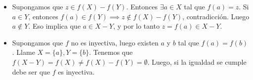 \begin{sol}
	\begin{itemize}
		\item Supongamos que $z \in f(X) - f(Y)$. Entonces $\exists a \in X $ tal que $f(a) = z$. Si $a \in Y$, entonces $f(a) \in f(Y) \implies z\notin f(X)-f(Y)$, contradicci\'on. Luego $a\notin Y$. Eso implica que $a\in X-Y$, y por lo tanto $z = f(a) \in X-Y$.
		\item Supongamos que $f$ no es inyectiva, luego existen $a$ y $b$ tal que $f(a) = f(b)$. Llame $X = \{a\}, Y = \{b\}$. Tenemos que $f(X-Y) = f(X) \neq f(X) - f(Y) = \emptyset$. Luego, si la igualdad se cumple debe ser que $f$ es inyectiva.
	\end{itemize}
\end{sol}

